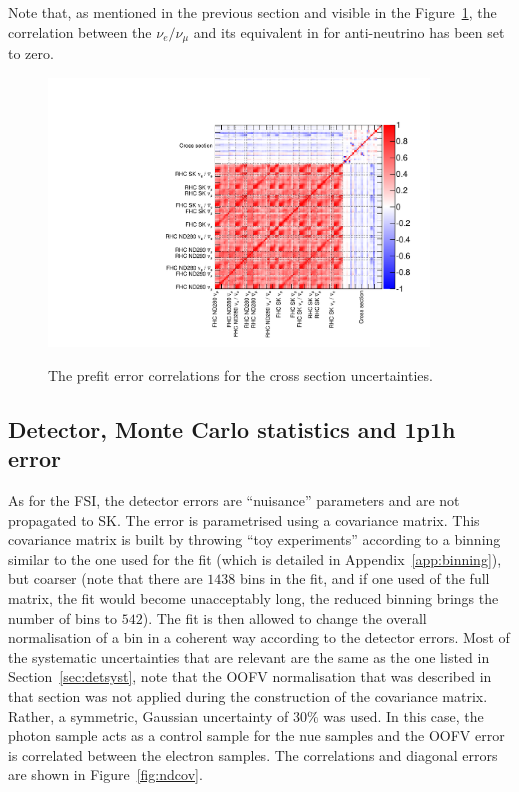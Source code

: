 Note that, as mentioned in the previous section and visible in the
Figure~\ref{fig:asimovprefitxsec}, the correlation between the
$\nu_{e}/\nu_{\mu}$ and its equivalent in for anti-neutrino has been
set to zero.

\begin{figure}[ht]
  \center
  \includegraphics[width=0.9\textwidth,page=3]{images/BANFF/OutputAsimov_matrices.pdf}\\
  \begin{center}
    \caption[The prefit error correlations for the cross section
    uncertainties]{The prefit error correlations for the cross section
      uncertainties.}
    \label{fig:asimovprefitxsec}
  \end{center}
\end{figure}

\subsection{Detector, Monte Carlo statistics and 1p1h error}
As for the \Gls{FSI}, the detector errors are ``nuisance'' parameters
and are not propagated to \Gls{SK}. The error is parametrised using a
covariance matrix. This covariance matrix is built by throwing ``toy
experiments'' according to a binning similar to the one used for the
fit (which is detailed in Appendix~\ref{app:binning}), but coarser
(note that there are $1438$ bins in the fit, and if one used of the
full matrix, the fit would become unacceptably long, the reduced
binning brings the number of bins to $542$). The fit is then allowed
to change the overall normalisation of a bin in a coherent way
according to the detector errors. Most of the systematic uncertainties
that are relevant are the same as the one listed in
Section~\ref{sec:detsyst}, note that the \Gls{OOFV} normalisation that
was described in that section was not applied during the construction
of the covariance matrix. Rather, a symmetric, Gaussian uncertainty of
$30\%$ was used. In this case, the photon sample acts as a control
sample for the \gls{nue} samples and the \Gls{OOFV} error is
correlated between the electron samples. The correlations and diagonal
errors are shown in Figure~\ref{fig:ndcov}.


